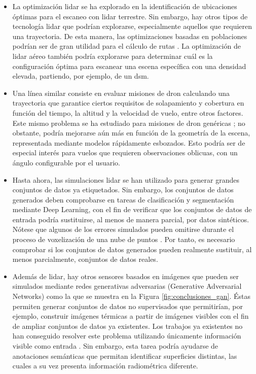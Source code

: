 \begin{itemize}
    \item La optimización \acrshort{lidar} se ha explorado en la identificación de ubicaciones óptimas para el escaneo con \acrshort{lidar} terrestre. Sin embargo, hay otros tipos de tecnología \acrshort{lidar} que podrían explorarse, especialmente aquellos que requieren una trayectoria. De esta manera, las optimizaciones basadas en poblaciones podrían ser de gran utilidad para el cálculo de rutas \cite{roberge_fast_2018}. La optimización de \acrshort{lidar} aéreo también podría explorarse para determinar cuál es la configuración óptima para escanear una escena específica con una densidad elevada, partiendo, por ejemplo, de un \acrshort{dsm}.
    \item Una línea similar consiste en evaluar misiones de dron calculando una trayectoria que garantice ciertos requisitos de solapamiento y cobertura en función del tiempo, la altitud y la velocidad de vuelo, entre otros factores. Este mismo problema se ha estudiado para misiones de dron genéricas \cite{pessacg_simplifying_2022}; no obstante, podría mejorarse aún más en función de la geometría de la escena, representada mediante modelos rápidamente esbozados. Esto podría ser de especial interés para vuelos que requieren observaciones oblicuas, con un ángulo configurable por el usuario. 
    \item Hasta ahora, las simulaciones \acrshort{lidar} se han utilizado para generar grandes conjuntos de datos ya etiquetados. Sin embargo, los conjuntos de datos generados deben comprobarse en tareas de clasificación y segmentación mediante Deep Learning, con el fin de verificar que los conjuntos de datos de entrada podría sustituirse, al menos de manera parcial, por datos sintéticos. Nótese que algunos de los errores simulados pueden omitirse durante el proceso de voxelización de una nube de puntos \cite{hackel_semantic3d_2017, behley_towards_2021}. Por tanto, es necesario comprobar si los conjuntos de datos generados pueden realmente sustituir, al menos parcialmente, conjuntos de datos reales. 
    \item Además de \acrshort{lidar}, hay otros sensores basados en imágenes que pueden ser simulados mediante redes generativas adversarias (Generative Adversarial Networks) como la que se muestra en la Figura \ref{fig:conclusiones_gan}. Éstas permiten generar conjuntos de datos no supervisados que permitirían, por ejemplo, construir imágenes térmicas a partir de imágenes visibles con el fin de ampliar conjuntos de datos ya existentes. Los trabajos ya existentes no han conseguido resolver este problema utilizando únicamente información visible como entrada \cite{li_multi-branch_2019, li_i-gans_2021, kniaz_thermalgan_2019, ozkanoglu_infragan_2022, yi_cycle_2023}. Sin embargo, esta tarea podría ayudarse de anotaciones semánticas que permitan identificar superficies distintas, las cuales a su vez presenta información radiométrica diferente.

\end{itemize}
